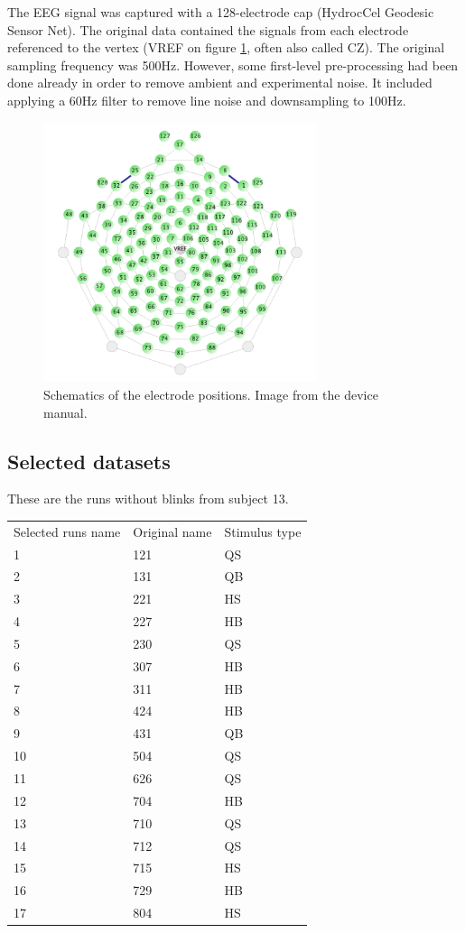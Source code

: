 \documentclass[a4paper]{article}
\begin{document}
The EEG signal was captured with a 128-electrode cap (HydrocCel Geodesic Sensor Net). The original data contained the signals from each electrode referenced to the vertex (VREF on figure \ref{figtouca}, often also called CZ). The original sampling frequency was 500Hz. However, some first-level pre-processing had been done already in order to remove ambient and experimental noise. It included applying a 60Hz filter to remove line noise and downsampling to 100Hz.

\begin{figure}[H]\label{figtouca}
\centering
\includegraphics[width=8cm]{128cap.png}
\caption{Schematics of the electrode positions. Image from the device manual.}
\end{figure}

\newpage
\subsection{Selected datasets}

These are the runs without blinks from subject 13.

\begin{table}[H]
\begin{tabular}{lll}
Selected runs name & Original name   & Stimulus type \\
1 & 121 & QS\\
2 & 131 & QB\\
3 & 221 & HS\\
4 & 227 & HB\\
5 & 230 & QS\\
6 & 307 & HB\\
7 & 311 & HB\\
8 & 424 & HB\\
9 & 431 & QB\\
10& 504 & QS\\
11& 626 & QS\\
12& 704 & HB\\
13& 710 & QS\\
14& 712 & QS\\
15& 715 & HS\\
16& 729 & HB\\
17& 804 & HS
\end{tabular}
\end{table}
\end{document}
